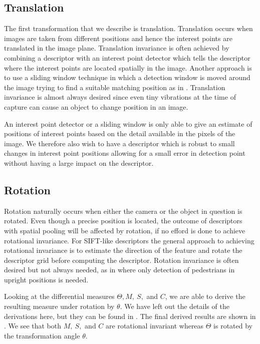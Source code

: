 \documentclass[thesis.tex]{subfiles}
\begin{document}
\subsection{Translation}
The first transformation that we describe is translation. Translation occurs when images are taken from different positions and hence the interest points are translated in the image plane. Translation invariance is often achieved by combining a descriptor with an interest point detector which tells the descriptor where the interest points are located spatially in the image. Another approach is to use a sliding window technique in which a detection window is moved around the image trying to find a suitable matching position as in \cite{felzenszwalb2008discriminatively}. Translation invariance is almost always desired since even tiny vibrations at the time of capture can cause an object to change position in an image.

An interest point detector or a sliding window is only able to give an estimate of positions of interest points based on the detail available in the pixels of the image. We therefore also wish to have a descriptor which is robust to small changes in interest point positions allowing for a small error in detection point without having a large impact on the descriptor.

\subsection{Rotation}
Rotation naturally occurs when either the camera or the object in question is rotated. Even though a precise position is located, the outcome of descriptors with spatial pooling will be affected by rotation, if no efford is done to achieve rotational invariance. For SIFT-like descriptors the general approach to achieving rotational invariance is to estimate the direction of the feature and rotate the descriptor grid before computing the descriptor. Rotation invariance is often desired but not always needed, as in \cite{dalal2005histograms,felzenszwalb2008discriminatively} where only detection of pedestrians in upright positions is needed.

Looking at the differential measures $\Theta, M,~S,$ and $C$, we are able to derive the resulting measure under rotation by $\theta$. We have left out the details of the derivations here, but they can be found in . The final derived results are shown in . We see that both $M,~S,$ and $C$ are rotational invariant whereas $\Theta$ is rotated by the transformation angle $\theta$.
%
\end{document}
